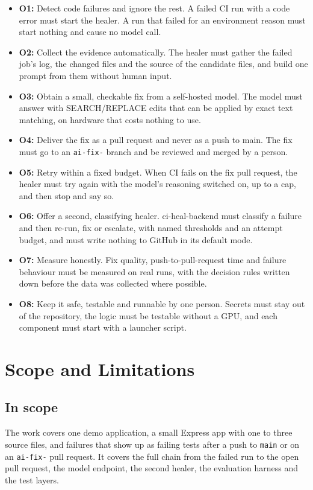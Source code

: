 \begin{itemize}
  \item \textbf{O1:} Detect code failures and ignore the rest. A failed CI run with a code error must start the healer. A run that failed for an environment reason must start nothing and cause no model call.
  \item \textbf{O2:} Collect the evidence automatically. The healer must gather the failed job's log, the changed files and the source of the candidate files, and build one prompt from them without human input.
  \item \textbf{O3:} Obtain a small, checkable fix from a self-hosted model. The model must answer with SEARCH/REPLACE edits that can be applied by exact text matching, on hardware that costs nothing to use.
  \item \textbf{O4:} Deliver the fix as a pull request and never as a push to main. The fix must go to an \texttt{ai-fix-} branch and be reviewed and merged by a person.
  \item \textbf{O5:} Retry within a fixed budget. When CI fails on the fix pull request, the healer must try again with the model's reasoning switched on, up to a cap, and then stop and say so.
  \item \textbf{O6:} Offer a second, classifying healer. ci-heal-backend must classify a failure and then re-run, fix or escalate, with named thresholds and an attempt budget, and must write nothing to GitHub in its default mode.
  \item \textbf{O7:} Measure honestly. Fix quality, push-to-pull-request time and failure behaviour must be measured on real runs, with the decision rules written down before the data was collected where possible.
  \item \textbf{O8:} Keep it safe, testable and runnable by one person. Secrets must stay out of the repository, the logic must be testable without a GPU, and each component must start with a launcher script.
\end{itemize}

\section{Scope and Limitations}

\subsection{In scope}

The work covers one demo application, a small Express app with one to three source files, and failures that show up as failing tests after a push to \texttt{main} or on an \texttt{ai-fix-} pull request. It covers the full chain from the failed run to the open pull request, the model endpoint, the second healer, the evaluation harness and the test layers.

